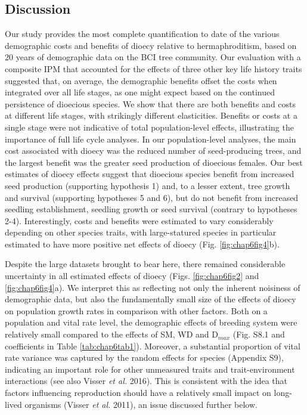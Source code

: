 \documentclass[b5paper,justified]{tufte-book} %
\begin{document}
\begin{fullwidth}
\section{Discussion}
Our study provides the most complete quantification to date of the various demographic costs and benefits of dioecy relative to hermaphroditism, based on 20 years of demographic data on the BCI tree community. Our evaluation with a composite IPM that accounted for the effects of three other key life history traits suggested that, on average, the demographic benefits offset the costs when integrated over all life stages, as one might expect based on the continued persistence of dioecious species. We show that there are both benefits and costs at different life stages, with strikingly different elasticities. Benefits or costs at a single stage were not indicative of total population-level effects, illustrating the importance of full life cycle analyses. In our population-level analyses, the main cost associated with dioecy was the reduced number of seed-producing trees, and the largest benefit was the greater seed production of dioecious females. Our best estimates of dioecy effects suggest that dioecious species benefit from increased seed production (supporting hypothesis 1) and, to a lesser extent, tree growth and survival (supporting hypotheses 5 and 6), but do not benefit from increased seedling establishment, seedling growth or seed survival (contrary to hypotheses 2-4).  Interestingly, costs and benefits were estimated to vary considerably depending on other species traits, with large-statured species in particular estimated to have more positive net effects of dioecy (Fig. \ref{fig:chap6fig4}b).  

Despite the large datasets brought to bear here, there remained considerable uncertainty in all estimated effects of dioecy (Figs. \ref{fig:chap6fig2} and \ref{fig:chap6fig4}a). We interpret this as reflecting not only the inherent noisiness of demographic data, but also the fundamentally small size of the effects of dioecy on population growth rates in comparison with other factors.  Both on a population and vital rate level, the demographic effects of breeding system were relatively small compared to the effects of SM, WD and D$_{max}$ (Fig. S8.1 and coefficients in Table \ref{tab:chap6tab1}). Moreover, a substantial proportion of vital rate variance was captured by the random effects for species (Appendix S9), indicating an important role for other unmeasured traits and trait-environment interactions (see also Visser \textit{et al.} 2016). This is consistent with the idea that factors influencing reproduction should have a relatively small impact on long-lived organisms (Visser \textit{et al.} 2011), an issue discussed further below.


\end{fullwidth}
\end{document}
